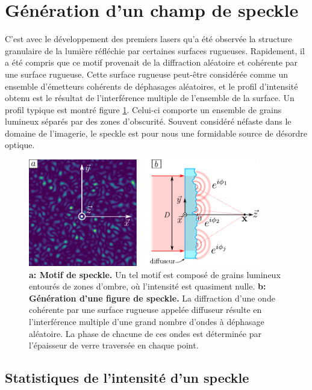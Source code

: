 \section{Génération d'un champ de speckle}
C'est avec le développement des premiers lasers qu'a été observée la structure granulaire de la lumière réfléchie par certaines surfaces rugueuses. Rapidement, il a été compris que ce motif provenait de la diffraction aléatoire et cohérente par une surface rugueuse. 
Cette surface rugueuse peut-être considérée comme un ensemble d'émetteurs cohérents de déphasages aléatoires, et le profil d'intensité obtenu est le résultat de l'interférence multiple de l'ensemble de la surface. Un profil typique est montré figure \ref{fig:speckle_pattern}. Celui-ci comporte un ensemble de grains lumineux séparés par des zones d'obscurité.
Souvent considéré néfaste dans le domaine de l'imagerie, le speckle est pour nous une formidable source de désordre optique. 

\begin{figure}
\centering
\includegraphics[width=0.9\textwidth]{Fig/Speckle/speckle_pattern.pdf}
\caption{\textbf{a: Motif de speckle.} Un tel motif est composé de grains lumineux entourés de zones d'ombre, où l'intensité est quasiment nulle. \textbf{b: Génération d'une figure de speckle.} La diffraction d'une onde cohérente par une surface rugueuse appelée diffuseur résulte en l'interférence multiple d'une grand nombre d'ondes à déphasage aléatoire. La phase de chacune de ces ondes est déterminée par l'épaisseur de verre traversée en chaque point.}
\label{fig:speckle_pattern}
\end{figure}



\subsection{Statistiques de l'intensité d'un speckle}

